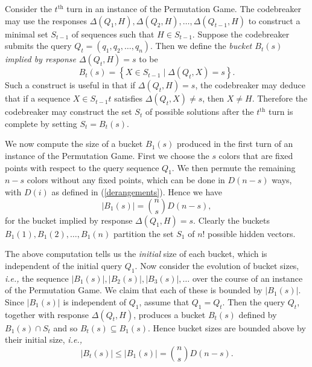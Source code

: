 \documentclass[12pt, a4paper]{article}
\newcommand{\intersect}{\cap}         %
\newcommand{\nth}{^{\text{th}}}       %
\begin{document}
	Consider the $t\nth$ turn in an instance of the Permutation Game. The codebreaker may use the responses $\Delta(Q_1, H), \Delta(Q_2, H), \ldots, \Delta(Q_{t-1}, H)$ to construct a minimal set $S_{t-1}$ of sequences such that $H\in S_{t-1}$. Suppose the codebreaker submits the query $Q_t = (q_1, q_2, \ldots, q_n)$. Then we define the \textit{bucket $B_t(s)$ implied by response $\Delta(Q_t, H)=s$} to be
	\begin{equation*}
		B_t(s) = \left\{X\in S_{t-1}\mid \Delta(Q_t, X) = s\right\}.
	\end{equation*}
	Such a construct is useful in that if $\Delta(Q_t, H) = s$, the codebreaker may deduce that if a sequence $X\in S_{t-1}t$ satisfies $\Delta(Q_t, X)\neq s$, then $X\neq H$. Therefore the codebreaker may construct the set $S_t$ of possible solutions after the $t\nth$ turn is complete by setting $S_t = B_t(s)$.
	
	We now compute the size of a bucket $B_1(s)$ produced in the first turn of an instance of the Permutation Game. First we choose the $s$ colors that are fixed points with respect to the query sequence $Q_1$. We then permute the remaining $n-s$ colors without any fixed points, which can be done in $D(n - s)$ ways, with $D(i)$ as defined in (\ref{derangements}). Hence we have
	\begin{equation*}
		|B_1(s)| = \binom{n}{s}D(n-s),
	\end{equation*}
	for the bucket implied by response $\Delta(Q_1, H) = s$. Clearly the buckets $B_1(1), B_1(2), \ldots, B_1(n)$ partition the set $S_1$ of $n!$ possible hidden vectors.
	
	The above computation tells us the \textit{initial} size of each bucket, which is independent of the initial query $Q_1$. Now consider the evolution of bucket sizes, \textit{i.e.,} the sequence $|B_1(s)|, |B_2(s)|, |B_3(s)|, \ldots$ over the course of an instance of the Permutation Game. We claim that each of these is bounded by $|B_1(s)|$. Since $|B_1(s)|$ is independent of $Q_1$, assume that $Q_1 = Q_t$. Then the query $Q_t$, together with response $\Delta(Q_t, H)$, produces a bucket $B_t(s)$ defined by $B_1(s)\intersect S_t$ and so $B_t(s) \subseteq B_1(s)$. Hence bucket sizes are bounded above by their initial size, \textit{i.e.,}
	\begin{equation*}
		|B_t(s)|\le |B_1(s)| = \binom{n}{s}D(n-s).
	\end{equation*}
\end{document}
